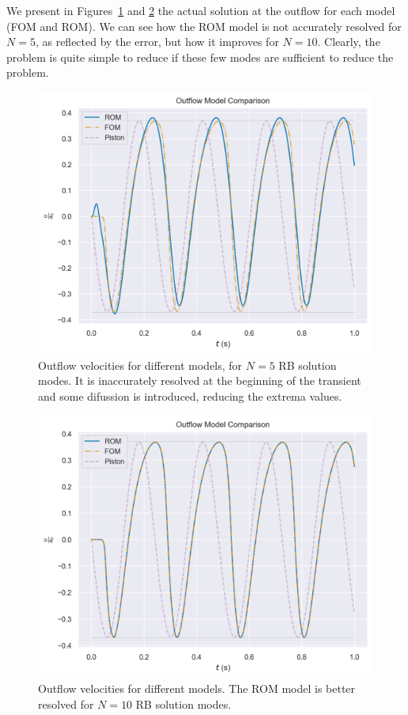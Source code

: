 \documentclass[../../thesis.tex]{subfiles}
\begin{document}
We present in Figures~\ref{fig:outflow_model_comparison_N_5} 
and \ref{fig:outflow_model_comparison_N_10} 
the actual solution at the outflow for each model (FOM and ROM).
We can see how the ROM model is not accurately resolved for $N=5$, as reflected by the error,
but how it improves for $N=10$.
Clearly, the problem is quite simple to reduce if these few modes are sufficient to reduce the problem.
\begin{figure}[h]
    \centering
    \includegraphics[width=\columnwidth]{research_project/piston/figures/rb_certification/outflow_probes_comparison_rom_5_srom_15_online_4.png}
    \caption{Outflow velocities for different models, for $N=5$ RB solution modes. 
    It is inaccurately resolved at the beginning of the transient 
    and some difussion is introduced, reducing the extrema values.}
    \label{fig:outflow_model_comparison_N_5}
\end{figure}
\begin{figure}[h]
    \centering
    \includegraphics[width=\columnwidth]{research_project/piston/figures/rb_certification/outflow_probes_comparison_rom_10_srom_20_online_4.png}
    \caption{Outflow velocities for different models. 
    The ROM model is better resolved for $N=10$ RB solution modes.}
    \label{fig:outflow_model_comparison_N_10}
\end{figure}
\end{document}
